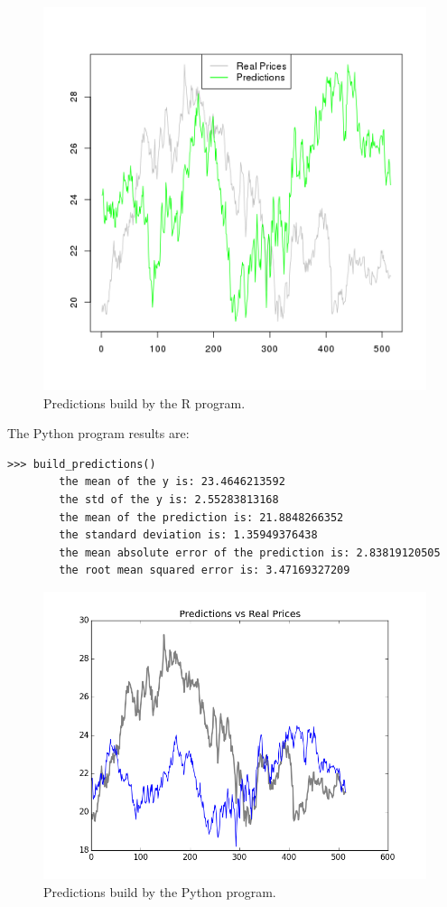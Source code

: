 \documentclass[
  twoside,
  11pt, a4paper,
  footinclude=true,
  headinclude=true,
  cleardoublepage=empty
]{scrreprt}
\begin{document}
    \begin{figure}[h]
        \includegraphics[scale=0.5]{img_examples/RPredicitions.png}
        \centering
        \caption{Predictions build by the R program.}
        \label{fig:RPredicitions}
    \end{figure}
    The Python program results are:
    \vspace{0.8cm}
    \begin{lstlisting}[basicstyle=\footnotesize]
        >>> build_predictions()
        the mean of the y is: 23.4646213592
        the std of the y is: 2.55283813168
        the mean of the prediction is: 21.8848266352
        the standard deviation is: 1.35949376438
        the mean absolute error of the prediction is: 2.83819120505
        the root mean squared error is: 3.47169327209
    \end{lstlisting}
    
    \begin{figure}[h]
        \includegraphics[scale=0.5]{img_examples/PythonPredictions.png}
        \centering
        \caption{Predictions build by the Python program.}
        \label{fig:PythonPredictions}
    \end{figure}
\end{document}
